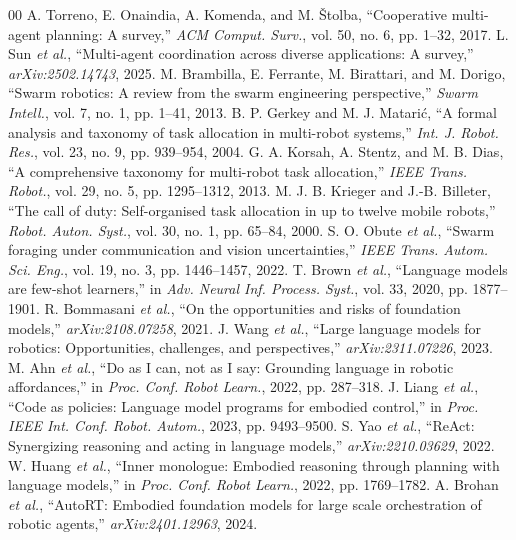 \documentclass[conference]{IEEEtran}
\begin{document}
\begin{thebibliography}{00}
 A. Torreno, E. Onaindia, A. Komenda, and M. \v{S}tolba, ``Cooperative multi-agent planning: A survey,'' \emph{ACM Comput. Surv.}, vol. 50, no. 6, pp. 1--32, 2017.
 L. Sun \emph{et al.}, ``Multi-agent coordination across diverse applications: A survey,'' \emph{arXiv:2502.14743}, 2025.
 M. Brambilla, E. Ferrante, M. Birattari, and M. Dorigo, ``Swarm robotics: A review from the swarm engineering perspective,'' \emph{Swarm Intell.}, vol. 7, no. 1, pp. 1--41, 2013.
 B. P. Gerkey and M. J. Matari\'c, ``A formal analysis and taxonomy of task allocation in multi-robot systems,'' \emph{Int. J. Robot. Res.}, vol. 23, no. 9, pp. 939--954, 2004.
 G. A. Korsah, A. Stentz, and M. B. Dias, ``A comprehensive taxonomy for multi-robot task allocation,'' \emph{IEEE Trans. Robot.}, vol. 29, no. 5, pp. 1295--1312, 2013.
 M. J. B. Krieger and J.-B. Billeter, ``The call of duty: Self-organised task allocation in up to twelve mobile robots,'' \emph{Robot. Auton. Syst.}, vol. 30, no. 1, pp. 65--84, 2000.
 S. O. Obute \emph{et al.}, ``Swarm foraging under communication and vision uncertainties,'' \emph{IEEE Trans. Autom. Sci. Eng.}, vol. 19, no. 3, pp. 1446--1457, 2022.
 T. Brown \emph{et al.}, ``Language models are few-shot learners,'' in \emph{Adv. Neural Inf. Process. Syst.}, vol. 33, 2020, pp. 1877--1901.
 R. Bommasani \emph{et al.}, ``On the opportunities and risks of foundation models,'' \emph{arXiv:2108.07258}, 2021.
 J. Wang \emph{et al.}, ``Large language models for robotics: Opportunities, challenges, and perspectives,'' \emph{arXiv:2311.07226}, 2023.
 M. Ahn \emph{et al.}, ``Do as I can, not as I say: Grounding language in robotic affordances,'' in \emph{Proc. Conf. Robot Learn.}, 2022, pp. 287--318.
 J. Liang \emph{et al.}, ``Code as policies: Language model programs for embodied control,'' in \emph{Proc. IEEE Int. Conf. Robot. Autom.}, 2023, pp. 9493--9500.
 S. Yao \emph{et al.}, ``ReAct: Synergizing reasoning and acting in language models,'' \emph{arXiv:2210.03629}, 2022.
 W. Huang \emph{et al.}, ``Inner monologue: Embodied reasoning through planning with language models,'' in \emph{Proc. Conf. Robot Learn.}, 2022, pp. 1769--1782.
 A. Brohan \emph{et al.}, ``AutoRT: Embodied foundation models for large scale orchestration of robotic agents,'' \emph{arXiv:2401.12963}, 2024.

\end{thebibliography}
\end{document}
